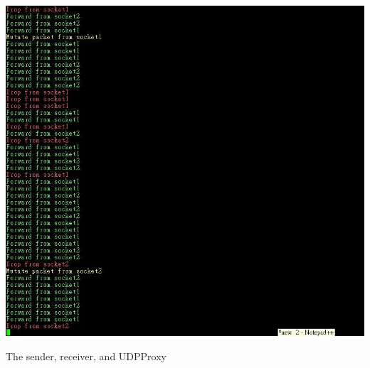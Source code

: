 \documentclass[10pt,a4paper]{article}
\begin{document}
\begin{center}
\includegraphics[scale=0.75]{shotproxy.jpg}
\end{center}
\begin{center}
{\small The sender, receiver, and UDPProxy}
\end{center}
\end{document}
